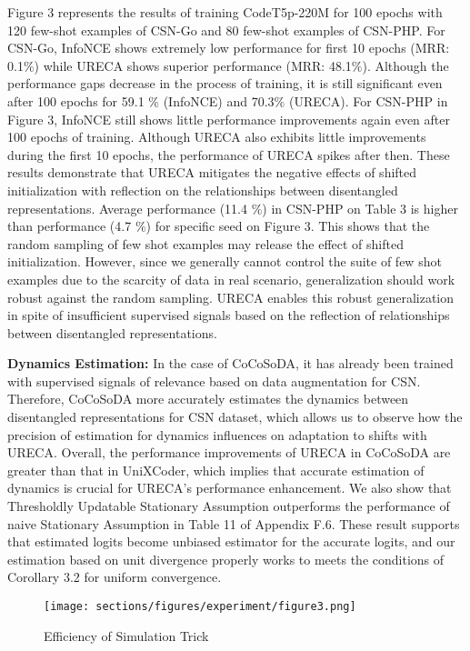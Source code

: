 Figure 3 represents the results of training CodeT5p-220M for 100 epochs with 120 few-shot examples 
of CSN-Go and 80 few-shot examples of CSN-PHP.
For CSN-Go, InfoNCE shows extremely low performance for first 10 epochs (MRR: 0.1$\%$)
while URECA shows superior performance (MRR: 48.1$\%$). 
Although the performance gaps decrease in the process of training,
it is still significant even after 100 epochs for 59.1 $\%$ (InfoNCE) and 70.3$\%$ (URECA). 
For CSN-PHP in Figure 3, InfoNCE still shows little performance improvements again even after 100 epochs of training. 
Although URECA also exhibits little improvements during the first 10 epochs, the performance of URECA spikes after then.
These results demonstrate that 
URECA mitigates the negative effects of shifted initialization with reflection on the relationships between disentangled representations. 
Average performance (11.4 $\%$) in CSN-PHP on Table 3 is higher than performance (4.7 $\%$) for specific seed on Figure 3. 
This shows that the random sampling of few shot examples may release the effect of shifted initialization.
However, since we generally cannot control the suite of few shot examples due to the scarcity of data in real scenario, 
generalization should work robust against the random sampling.
URECA enables this robust generalization in spite of insufficient supervised signals 
based on the reflection of relationships between disentangled representations. 

\textbf{Dynamics Estimation: }
In the case of CoCoSoDA, it has already been trained with supervised signals of relevance based on data augmentation for CSN.
Therefore, CoCoSoDA more accurately estimates the dynamics between disentangled representations for CSN dataset,
which allows us to observe how the precision of estimation for dynamics influences on adaptation to shifts with URECA.
Overall, the performance improvements of URECA in CoCoSoDA are greater than that in UniXCoder, 
which implies that accurate estimation of dynamics is crucial for URECA's performance enhancement.
We also show that Thresholdly Updatable Stationary Assumption outperforms the performance of naive Stationary Assumption 
in Table 11 of Appendix F.6.
These result supports that estimated logits become unbiased estimator for the accurate logits, 
and our estimation based on unit divergence properly works to meets the conditions of Corollary 3.2 for uniform convergence.  

\begin{figure}[t]
\centering
\texttt{[image: sections/figures/experiment/figure3.png]}
\caption{Efficiency of Simulation Trick}
\label{efficiency}
\end{figure}

